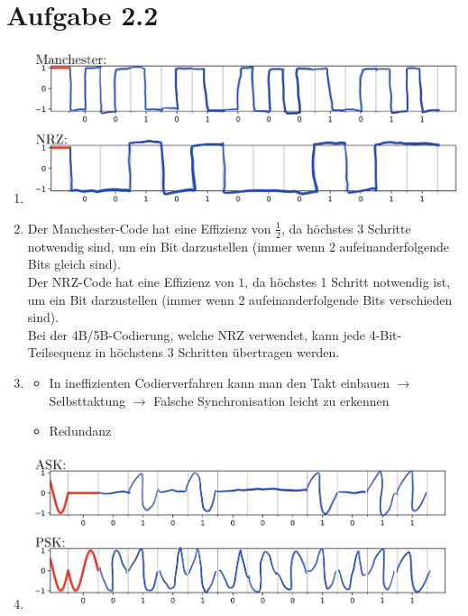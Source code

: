 \documentclass[12pt, a4paper]{article}
\begin{document}
\section*{Aufgabe 2.2}
\begin{enumerate}[label=\alph*)]
	\item	\includegraphics[scale=0.5]{2.1_a.png}
	\item	Der Manchester-Code hat eine Effizienz von $\frac{1}{2}$, da höchstes 3 Schritte notwendig sind, um ein Bit darzustellen (immer wenn 2 aufeinanderfolgende Bits gleich sind).\\
			Der NRZ-Code hat eine Effizienz von $1$, da höchstes 1 Schritt notwendig ist, um ein Bit darzustellen (immer wenn 2 aufeinanderfolgende Bits verschieden sind).\\
			
			Bei der 4B/5B-Codierung, welche NRZ verwendet, kann jede 4-Bit-Teilsequenz in höchstens 3 Schritten übertragen werden.
	\item	\begin{itemize}
				\item	In ineffizienten Codierverfahren kann man den Takt einbauen $\rightarrow$ Selbsttaktung $\rightarrow$ Falsche Synchronisation leicht zu erkennen
				\item	Redundanz
			\end{itemize}
	\item	\includegraphics[scale=0.5]{2.1_d.png}
\end{enumerate}


\newpage
\end{document}
